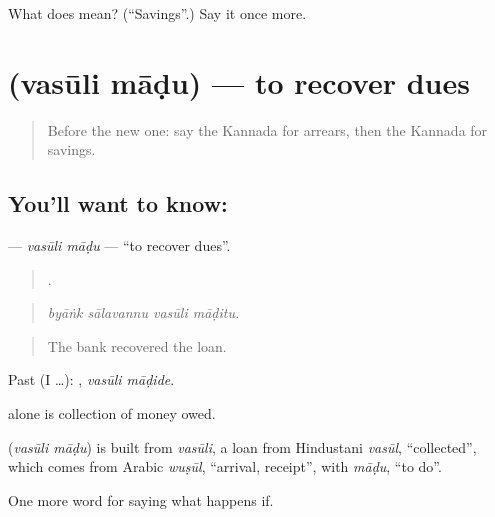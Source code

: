 \begin{tcolorbox}[breakable,colback=teal!4,colframe=teal!35!black,title={Before you move on}]
What does  mean? (\textquotedblleft{}Savings\textquotedblright{}.) Say it once more.
\end{tcolorbox}
\section[\texorpdfstring{\kn{ವಸೂಲಿ} \kn{ಮಾಡು} (vasūli māḍu)}{ವಸೂಲಿ ಮಾಡು (vasūli māḍu)}]{  (vasūli māḍu) — to recover dues}

\label{lesson:KA-C417-vasuli-madu}



\begin{quote}
Before the new one: say the Kannada for arrears, then the Kannada for savings.
\end{quote}

\subsection*{You'll want to know:  }
\textbf{ } — \emph{vasūli māḍu} — \textquotedblleft{}to recover dues\textquotedblright{}.

\begin{quote}
   .
\end{quote}

\begin{quote}
\emph{byāṅk sālavannu vasūli māḍitu.}
\end{quote}

\begin{quote}
The bank recovered the loan.
\end{quote}

Past (I …):  , \emph{vasūli māḍide}.

 alone is collection of money owed.

\begin{cousinweb}
\textbf{ } (\emph{vasūli māḍu}) is built from \emph{vasūli}, a loan from Hindustani \emph{vasūl}, \textquotedblleft{}collected\textquotedblright{}, which comes from Arabic \emph{wuṣūl}, \textquotedblleft{}arrival, receipt\textquotedblright{}, with \emph{māḍu}, \textquotedblleft{}to do\textquotedblright{}.
\end{cousinweb}

\begin{grammarlens}[title={What you've built}]
One more word for saying what happens if.
\end{grammarlens}

